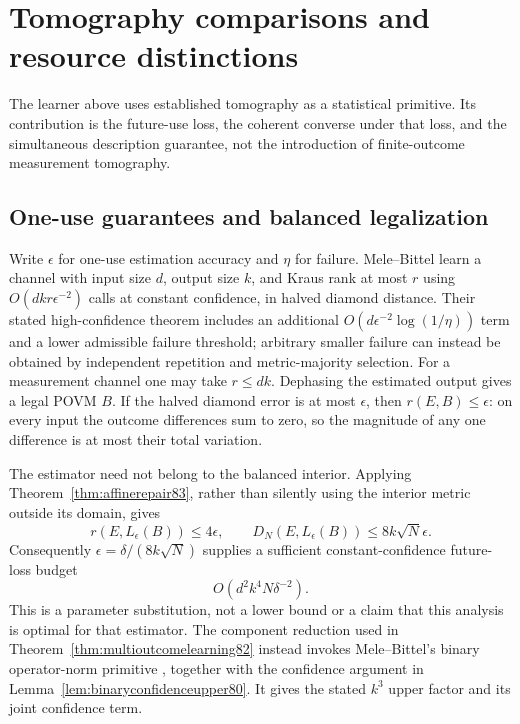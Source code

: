 \section{Tomography comparisons and resource distinctions}
\label{sec:priority83}

The learner above uses established tomography as a statistical
primitive.  Its contribution is the future-use loss, the coherent
converse under that loss, and the simultaneous description guarantee,
not the introduction of finite-outcome measurement tomography.

\subsection{One-use guarantees and balanced legalization}
Write $\epsilon$ for one-use estimation accuracy and $\eta$ for failure.
Mele--Bittel \cite[Theorem~III.3]{MB67} learn a channel with input
size $d$, output size $k$, and Kraus rank at most $r$ using
$O(dkr\epsilon^{-2})$ calls at constant confidence, in halved diamond
distance.  Their stated high-confidence theorem includes an additional
$O(d\epsilon^{-2}\log(1/\eta))$ term and a lower admissible failure
threshold; arbitrary smaller failure can instead be obtained by
independent repetition and metric-majority selection.  For a
measurement channel one may take $r\le dk$.  Dephasing the estimated
output gives a legal POVM $B$.  If the halved diamond error is at most
$\epsilon$, then $r(E,B)\le\epsilon$: on every input the outcome
differences sum to zero, so the magnitude of any one difference is at
most their total variation.

The estimator need not belong to the balanced interior.  Applying
Theorem~\ref{thm:affinerepair83}, rather than silently using the interior
metric outside its domain, gives
\[
 r(E,L_\epsilon(B))\le4\epsilon,\qquad
 D_N(E,L_\epsilon(B))\le8k\sqrt N\epsilon.
\]
Consequently $\epsilon=\delta/(8k\sqrt N)$ supplies a sufficient
constant-confidence future-loss budget
\begin{equation}\label{eq:mbdirect83}
 O(d^2k^4N\delta^{-2}).
\end{equation}
This is a parameter substitution, not a lower bound or a claim that
this analysis is optimal for that estimator.  The component reduction
used in Theorem~\ref{thm:multioutcomelearning82} instead invokes
Mele--Bittel's binary operator-norm primitive
\cite[Corollary~III.9]{MB67}, together with the confidence argument in
Lemma~\ref{lem:binaryconfidenceupper80}.  It gives the stated $k^3$
upper factor and its joint confidence term.

